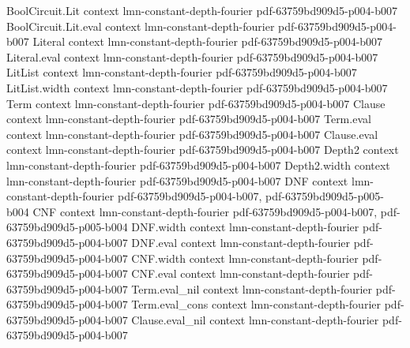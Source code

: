 \begin{lemma}
\label{BoolFourier.fourier_coeff_eq}
\leanok
{}
\proofstep
  {BoolCircuit.Lit}
  {context}
  {lmn-constant-depth-fourier}
  {pdf-63759bd909d5-p004-b007}
\proofstep
  {BoolCircuit.Lit.eval}
  {context}
  {lmn-constant-depth-fourier}
  {pdf-63759bd909d5-p004-b007}
\proofstep
  {Literal}
  {context}
  {lmn-constant-depth-fourier}
  {pdf-63759bd909d5-p004-b007}
\proofstep
  {Literal.eval}
  {context}
  {lmn-constant-depth-fourier}
  {pdf-63759bd909d5-p004-b007}
\proofstep
  {LitList}
  {context}
  {lmn-constant-depth-fourier}
  {pdf-63759bd909d5-p004-b007}
\proofstep
  {LitList.width}
  {context}
  {lmn-constant-depth-fourier}
  {pdf-63759bd909d5-p004-b007}
\proofstep
  {Term}
  {context}
  {lmn-constant-depth-fourier}
  {pdf-63759bd909d5-p004-b007}
\proofstep
  {Clause}
  {context}
  {lmn-constant-depth-fourier}
  {pdf-63759bd909d5-p004-b007}
\proofstep
  {Term.eval}
  {context}
  {lmn-constant-depth-fourier}
  {pdf-63759bd909d5-p004-b007}
\proofstep
  {Clause.eval}
  {context}
  {lmn-constant-depth-fourier}
  {pdf-63759bd909d5-p004-b007}
\proofstep
  {Depth2}
  {context}
  {lmn-constant-depth-fourier}
  {pdf-63759bd909d5-p004-b007}
\proofstep
  {Depth2.width}
  {context}
  {lmn-constant-depth-fourier}
  {pdf-63759bd909d5-p004-b007}
\proofstep
  {DNF}
  {context}
  {lmn-constant-depth-fourier}
  {pdf-63759bd909d5-p004-b007,
    pdf-63759bd909d5-p005-b004}
\proofstep
  {CNF}
  {context}
  {lmn-constant-depth-fourier}
  {pdf-63759bd909d5-p004-b007,
    pdf-63759bd909d5-p005-b004}
\proofstep
  {DNF.width}
  {context}
  {lmn-constant-depth-fourier}
  {pdf-63759bd909d5-p004-b007}
\proofstep
  {DNF.eval}
  {context}
  {lmn-constant-depth-fourier}
  {pdf-63759bd909d5-p004-b007}
\proofstep
  {CNF.width}
  {context}
  {lmn-constant-depth-fourier}
  {pdf-63759bd909d5-p004-b007}
\proofstep
  {CNF.eval}
  {context}
  {lmn-constant-depth-fourier}
  {pdf-63759bd909d5-p004-b007}
\proofstep
  {Term.eval_nil}
  {context}
  {lmn-constant-depth-fourier}
  {pdf-63759bd909d5-p004-b007}
\proofstep
  {Term.eval_cons}
  {context}
  {lmn-constant-depth-fourier}
  {pdf-63759bd909d5-p004-b007}
\proofstep
  {Clause.eval_nil}
  {context}
  {lmn-constant-depth-fourier}
  {pdf-63759bd909d5-p004-b007}

\end{lemma}
